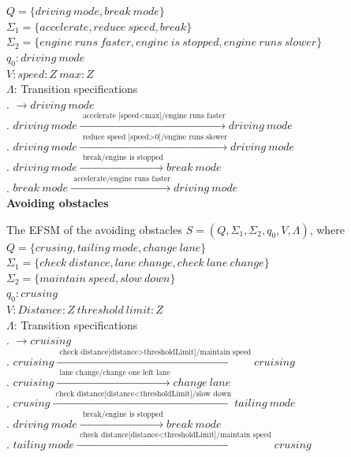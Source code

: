\documentclass[12pt]{article}
\begin{document}
\begin{spacing}{1.5}
\noindent $Q = \{driving~mode, break~mode\}$\\
\noindent $\Sigma_1 = \{accelerate,reduce~speed,break\}$\\
\noindent $\Sigma_2 = \{engine~runs~faster,engine~is~stopped,
engine~runs~slower\}$\\
\noindent $q_0: driving~mode$\\
\noindent $V: speed:Z~max:Z$\\
\noindent $\Lambda$: Transition specifications\\
. $\rightarrow driving~mode$\\
. $driving~mode \xrightarrow {\text { accelerate~[speed<max]/engine~runs~faster}} driving~mode$\\
. $driving~mode \xrightarrow {\text { reduce~speed~[speed>0]/engine~runs~slower}} driving~mode$\\
. $driving~mode \xrightarrow {\text { break/engine~is~stopped}} break~mode$\\
. $break~mode \xrightarrow {\text { accelerate/engine~runs~faster}} driving~mode$\\

\newpage
\noindent \textbf{Avoiding obstacles}

\noindent The EFSM of the avoiding obstacles $S = (Q, \Sigma_1, \Sigma_2, q_0, V, \Lambda)$, where\\

\noindent $Q = \{crusing,tailing~mode,change~lane\}$\\
\noindent $\Sigma_1 = \{check~distance,lane~change,check~lane~change\}$\\
\noindent $\Sigma_2 = \{maintain~speed,slow~down\}$\\
\noindent $q_0: crusing$\\
\noindent $V: Distance:Z~threshold~limit:Z$\\
\noindent $\Lambda$: Transition specifications\\
. $\rightarrow cruising$\\
. $cruising \xrightarrow {\text { check~distance[distance>thresholdLimit]/maintain~speed}} cruising$\\
. $cruising \xrightarrow {\text { lane~change/change~one~left~lane}} change~lane$\\
. $crusing \xrightarrow {\text { check~distance[distance<thresholdLimit]/slow~down}} tailing~mode$\\
. $driving~mode \xrightarrow {\text { break/engine~is~stopped}} break~mode$\\
. $tailing~mode \xrightarrow {\text { check~distance[distance<thresholdLimit]/maintain~speed}} crusing$\\


\end{spacing}
\end{document}
